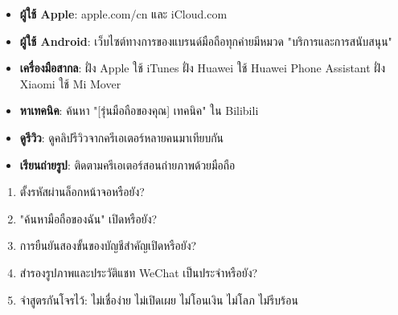 

\begin{itemize}
  \item \textbf{ผู้ใช้ Apple}: apple.com/cn และ iCloud.com
  \item \textbf{ผู้ใช้ Android}: เว็บไซต์ทางการของแบรนด์มือถือทุกค่ายมีหมวด "บริการและการสนับสนุน"
  \item \textbf{เครื่องมือสากล}: ฝั่ง Apple ใช้ iTunes ฝั่ง Huawei ใช้ Huawei Phone Assistant ฝั่ง Xiaomi ใช้ Mi Mover
\end{itemize}


\begin{itemize}
  \item \textbf{หาเทคนิค}: ค้นหา "[รุ่นมือถือของคุณ] เทคนิค" ใน Bilibili
  \item \textbf{ดูรีวิว}: ดูคลิปรีวิวจากครีเอเตอร์หลายคนมาเทียบกัน
  \item \textbf{เรียนถ่ายรูป}: ติดตามครีเอเตอร์สอนถ่ายภาพด้วยมือถือ
\end{itemize}


\begin{enumerate}
  \item ตั้งรหัสผ่านล็อกหน้าจอหรือยัง?
  \item "ค้นหามือถือของฉัน" เปิดหรือยัง?
  \item การยืนยันสองขั้นของบัญชีสำคัญเปิดหรือยัง?
  \item สำรองรูปภาพและประวัติแชท WeChat เป็นประจำหรือยัง?
  \item จำสูตรกันโจรไว้: ไม่เชื่อง่าย ไม่เปิดเผย ไม่โอนเงิน ไม่โลภ ไม่รีบร้อน
\end{enumerate}
